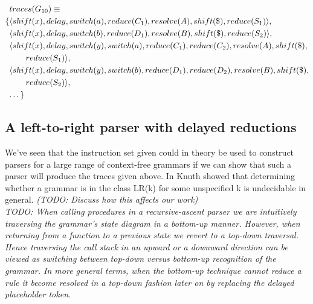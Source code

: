 \documentclass[a4paper,11pt]{article}
\begin{document}
\parbox{.3\textwidth}{\begin{align*}
&traces(G_{10}) \equiv \\
 \{ & \langle shift(x), delay, switch(a), reduce(C_1), resolve(A), shift(\$), reduce(S_1) \rangle,\\
    & \langle shift(x), delay, switch(b), reduce(D_1), resolve(B), shift(\$), reduce(S_2) \rangle,\\
    & \langle shift(x), delay, switch(y), switch(a), reduce(C_1), reduce(C_2), resolve(A), shift(\$), \\&\qquad reduce(S_1) \rangle,\\
    & \langle shift(x), delay, switch(y), switch(b), reduce(D_1), reduce(D_2), resolve(B), shift(\$), \\&\qquad reduce(S_2) \rangle,\\
    & \textellipsis \}
\end{align*}}


\subsection{A left-to-right parser with delayed reductions}
We've seen that the instruction set given could in theory be used to construct parsers for a large range of context-free grammars if we can show that such a parser will produce the traces given above.
In \cite{knuth65} Knuth showed that determining whether a grammar is in the class LR(k) for some unspecified k is undecidable in general. \emph{ (TODO: Discuss how this affects our work) }\\

\emph{TODO:
When calling procedures in a recursive-ascent parser we are intuitively traversing the grammar's state diagram in a bottom-up manner.
However, when returning from a function to a previous state we revert to a top-down traversal.
Hence traversing the call stack in an upward or a downward direction can be viewed as switching between top-down versus bottom-up recognition of the grammar. 
In more general terms, when the bottom-up technique cannot reduce a rule it become resolved in a top-down fashion later on by replacing the delayed placeholder token.}
\end{document}
